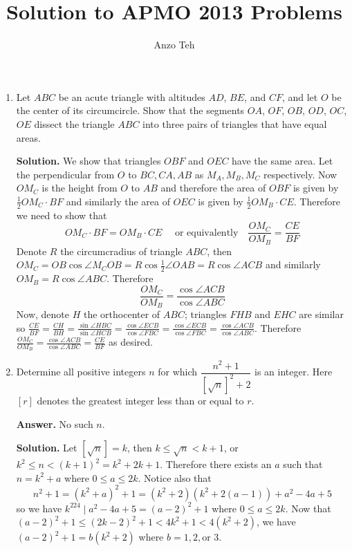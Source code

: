 \documentclass[11pt,a4paper]{article}
\begin{document}
\newcommand{\la}{\leftarrow}
\newcommand{\lra}{\leftrightarrow}
\newcommand{\bbN}{\mathbb{N}}
\newcommand{\bbZ}{\mathbb{Z}}
\newcommand{\dsum}{\displaystyle\sum}
\newcommand{\dprod}{\displaystyle\prod}


\title{Solution to APMO 2013 Problems}
\author{Anzo Teh}
\date{}
\maketitle

\begin{enumerate}
	\item Let $ABC$ be an acute triangle with altitudes $AD$, $BE$, and $CF$, and let $O$ be the center of its circumcircle. Show that the segments $OA$, $OF$, $OB$, $OD$, $OC$, $OE$ dissect the triangle $ABC$ into three pairs of triangles that have equal areas.
	
	\textbf{Solution.} We show that triangles $OBF$ and $OEC$ have the same area. Let the perpendicular from $O$ to $BC, CA, AB$ as $M_A, M_B, M_C$ respectively. Now $OM_C$ is the height from $O$ to $AB$ and therefore the area of $OBF$ is given by $\frac 12 OM_C\cdot BF$ and similarly the area of $OEC$ is given by $\frac 12 OM_B \cdot CE$. Therefore we need to show that 
	\[
	OM_C\cdot BF = OM_B \cdot CE \quad \text{ or equivalently}\quad \frac{OM_C}{OM_B} = \frac{CE}{BF}
	\]
	Denote $R$ the circumcradius of triangle $ABC$, then $OM_C=OB\cos \angle M_COB=R\cos \frac 12 \angle OAB=R\cos \angle ACB$ and similarly $OM_B = R\cos\angle ABC$. Therefore 
	\[
	\frac{OM_C}{OM_B} = \frac{\cos\angle ACB}{\cos\angle ABC}
	\]
	Now, denote $H$ the orthocenter of $ABC$; triangles $FHB$ and $EHC$ are similar so $\frac{CE}{BF}=\frac{CH}{BH}=\frac{\sin\angle HBC}{\sin\angle HCB}=\frac{\cos\angle ECB}{\cos\angle FBC}=\frac{\cos\angle ECB}{\cos\angle FBC}=\frac{\cos\angle ACB}{\cos\angle ABC}$. Therefore $ \frac{OM_C}{OM_B} = \frac{\cos\angle ACB}{\cos\angle ABC} = \frac{CE}{BF}$ as desired. 
		
	\item Determine all positive integers $n$ for which $\dfrac{n^2+1}{[\sqrt{n}]^2+2}$ is an integer. Here $[r]$ denotes the greatest integer less than or equal to $r$.
	
	\textbf{Answer.} No such $n$. 
	
	\textbf{Solution.} Let $[\sqrt{n}] = k$, then $k\le \sqrt{n}< k+1$, or $k^2\le n < (k+1)^2 = k^2+2k+1$. Therefore there exists an $a$ such that $n = k^2+a$ where $0\le a\le 2k$. Notice also that 
	\[
	n^2+1=(k^2+a)^2+1 = (k^2+2)(k^2+2(a-1))+a^2-4a+5 
	\]
	so we have $k^224\mid a^2-4a+5=(a-2)^2+1$ where $0\le a \le 2k$. Now that $(a-2)^2+1\le (2k-2)^2+1 < 4k^2+1 < 4(k^2+2)$, we have $(a-2)^2+1 = b(k^2+2)$ where $b=1, 2, $or $3$. 
	

\end{enumerate}
\end{document}
